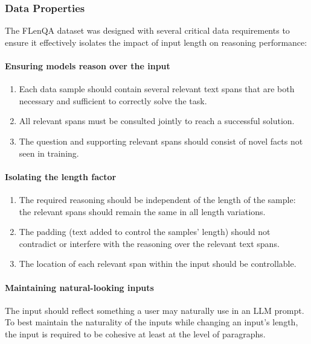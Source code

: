 \documentclass[11pt]{article}
\begin{document}
\subsubsection{Data Properties}
The FLenQA dataset was designed with several critical data requirements to ensure it effectively isolates the impact of input length on reasoning performance:
\paragraph{Ensuring models reason over the input}
\begin{enumerate}
    \item {Each data sample should contain several relevant text spans that are both necessary and sufficient to correctly solve the task}.
    \item {All relevant spans must be consulted jointly to reach a successful solution}.
    \item {The question and supporting relevant spans should consist of novel facts not seen in training.}
\end{enumerate}

\paragraph{Isolating the length factor}
\begin{enumerate}
    \item {The required reasoning should be independent of the length of the sample}: the relevant spans should remain the same in all length variations.
    \item The padding (text added to control the samples' length) should not contradict or interfere with the reasoning over the relevant text spans.
    \item The location of each relevant span within the input should be controllable.
\end{enumerate}

\paragraph{Maintaining natural-looking inputs}
The input should reflect something a user may naturally use in an LLM prompt. To best maintain the naturality of the inputs while changing an input's length,  the input is required to be cohesive at least at the level of paragraphs.
\end{document}

